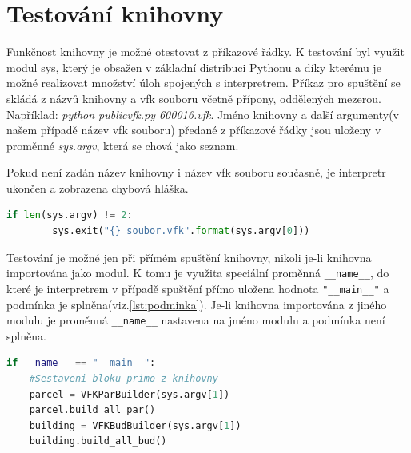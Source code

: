 \section{Testování knihovny}
Funkčnost knihovny je možné otestovat z příkazové řádky. K testování byl využit modul sys, který je obsažen v základní distribuci Pythonu a díky kterému je možné realizovat množství úloh spojených s interpretrem. Příkaz pro spuštění se skládá z názvů knihovny a vfk souboru včetně přípony, oddělených mezerou. Například: \textit{python publicvfk.py 600016.vfk}. Jméno knihovny a další argumenty(v našem případě název vfk souboru) předané z příkazové řádky jsou uloženy v proměnné \textit{sys.argv}, která se chová jako seznam.

Pokud není zadán název knihovny i název vfk souboru současně, je interpretr ukončen a zobrazena chybová hláška.
\begin{lstlisting}[language=Python, numbers=none]
    if len(sys.argv) != 2:
        sys.exit("{} soubor.vfk".format(sys.argv[0]))
\end{lstlisting}

Testování je možné jen při přímém spuštění knihovny, nikoli je-li knihovna importována jako modul. K tomu je využita speciální proměnná \verb|__name__|, do které je interpretrem v případě spuštění přímo uložena hodnota \verb|"__main__"| a podmínka je splněna(viz.\ref{lst:podminka}). Je-li knihovna importována z jiného modulu je proměnná \verb|__name__| nastavena na jméno modulu a podmínka není splněna.
\begin{lstlisting}[caption=Ukázka sestavení bloků provedeném jen při přímém spuštění knihovny, language=Python, numbers=none, label=lst:podminka]
if __name__ == "__main__":
	#Sestaveni bloku primo z knihovny
    parcel = VFKParBuilder(sys.argv[1])
    parcel.build_all_par()
    building = VFKBudBuilder(sys.argv[1])
    building.build_all_bud()
\end{lstlisting}
